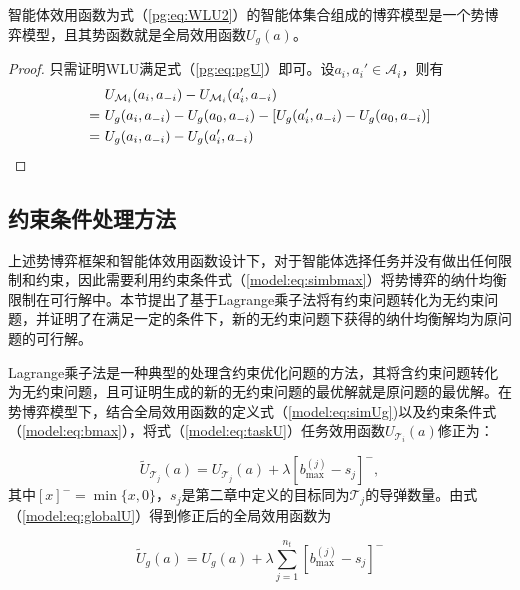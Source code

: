 \begin{proposition}[WLU可行性]
\label{pg:pro:mwlu}
	智能体效用函数为式（\ref{pg:eq:WLU2}）的智能体集合组成的博弈模型是一个势博弈模型，且其势函数就是全局效用函数$U_g(a)$。
	
	\begin{proof}
	只需证明WLU满足式（\ref{pg:eq:pgU}）即可。设$a_i,a_i' \in \mathcal{A}_i$，则有
	\begin{align}
		&\ U_{\mathcal{M}_i}(a_i,a_{-i}) - U_{\mathcal{M}_i}(a_i',a_{-i})\notag\\
		=&\ U_g(a_i,a_{-i}) - U_g(a_0,a_{-i}) - [U_g(a_i',a_{-i}) - U_g(a_0,a_{-i})]\notag\\
		=&\ U_g(a_i,a_{-i}) - U_g(a_i',a_{-i}) \notag
	\end{align}
	\end{proof}
\end{proposition}



\subsection{约束条件处理方法}
\label{pg:mwlu}

上述势博弈框架和智能体效用函数设计下，对于智能体选择任务并没有做出任何限制和约束，因此需要利用约束条件式（\ref{model:eq:simbmax}）将势博弈的纳什均衡限制在可行解中。本节提出了基于Lagrange乘子法将有约束问题转化为无约束问题，并证明了在满足一定的条件下，新的无约束问题下获得的纳什均衡解均为原问题的可行解。

Lagrange乘子法是一种典型的处理含约束优化问题的方法，其将含约束问题转化为无约束问题，且可证明生成的新的无约束问题的最优解就是原问题的最优解。在势博弈模型下，结合全局效用函数的定义式（\ref{model:eq:simUg})以及约束条件式（\ref{model:eq:bmax}），将式（\ref{model:eq:taskU}）任务效用函数$U_{\mathcal{T}_i}(a)$修正为：

\begin{equation}
\label{pg:eq:newTaskU}
	\widetilde U_{\mathcal{T}_j}(a) = U_{\mathcal{T}_j}(a) + \lambda [b_{\text{max}}^{(j)} - s_j]^-,
\end{equation}
其中$[x]^-=\min\{x,0\}$，$s_j$是第二章中定义的目标同为$\mathcal{T}_j$的导弹数量。由式（\ref{model:eq:globalU}）得到修正后的全局效用函数为

\begin{equation}
\label{pg:eq:newglobalU}
		\widetilde U_g(a) = U_g(a) +  \lambda \sum_{j=1}^{n_t}[b_{\text{max}}^{(j)} - s_j]^-
	\end{equation}

